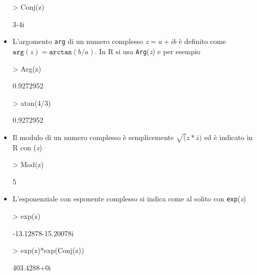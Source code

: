 \documentclass[onecolumn,11pt]{book}
\newcommand{\varia}[1]{\textsl{\textsf{#1}}}
\begin{document}
\begin{itemize}
\begin{Schunk}
\begin{Sinput}
> Conj(z)
\end{Sinput}
\begin{Soutput}
[1] 3-4i
\end{Soutput}
\end{Schunk}
\item{}L'argomento \texttt{arg} di un numero complesso $z=a +i b$ \`e definito come 
$\texttt{arg}(z) =\texttt{arctan}(b/a)$. In  \textsf{R} si usa
\texttt{Arg}(\varia{z})
e per esempio
\begin{Schunk}
\begin{Sinput}
>  Arg(z)
\end{Sinput}
\begin{Soutput}
[1] 0.9272952
\end{Soutput}
\begin{Sinput}
> atan(4/3)
\end{Sinput}
\begin{Soutput}
[1] 0.9272952
\end{Soutput}
\end{Schunk}
\item{}Il modulo di  un numero complesso \`e semplicemente $\sqrt(z*\overline{z})$ ed \`e indicato in \textsf{R} con  (\varia{z})
\begin{Schunk}
\begin{Sinput}
> Mod(z)
\end{Sinput}
\begin{Soutput}
[1] 5
\end{Soutput}
\end{Schunk}
\item{}L'esponenziale con esponente complesso si indica come al solito con
\texttt{exp}(\varia{z}) 
\begin{Schunk}
\begin{Sinput}
> exp(z)
\end{Sinput}
\begin{Soutput}
[1] -13.12878-15.20078i
\end{Soutput}
\begin{Sinput}
> exp(z)*exp(Conj(z))   		
\end{Sinput}
\begin{Soutput}
[1] 403.4288+0i
\end{Soutput}
\end{Schunk}
\end{itemize}
 


 
\end{document}
